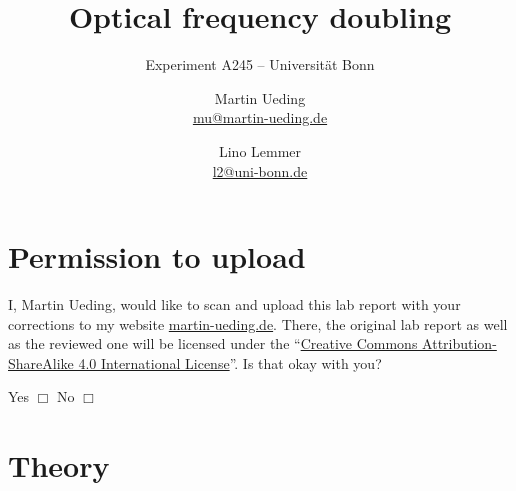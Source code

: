 \documentclass[11pt, english, fleqn, DIV=15, headinclude, BCOR=2cm]{scrreprt}
\title{Optical frequency doubling}
\subtitle{Experiment A245 -- Universität Bonn}
\author{%
    Martin Ueding \\
    \small{\href{mailto:mu@martin-ueding.de}{mu@martin-ueding.de}}
    \and
    Lino Lemmer \\
    \small{\href{mailto:l2@uni-bonn.de}{l2@uni-bonn.de}}
}
\date{\daterange{2016-05-23}{2016-05-24}}
\begin{document}
\maketitle

\begin{abstract}
\end{abstract}

\tableofcontents

\chapter*{Permission to upload}

I, Martin Ueding, would like to scan and upload this lab report with your
corrections to my website \href{http://martin-ueding.de}{martin-ueding.de}.
There, the original lab report as well as the reviewed one will be licensed
under the “\href{http://creativecommons.org/licenses/by-sa/4.0/}{Creative
Commons Attribution-ShareAlike 4.0 International License}”. Is that okay with
you?

Yes $\Box$ \hspace{2cm} No $\Box$

\chapter{Theory}
\end{document}
